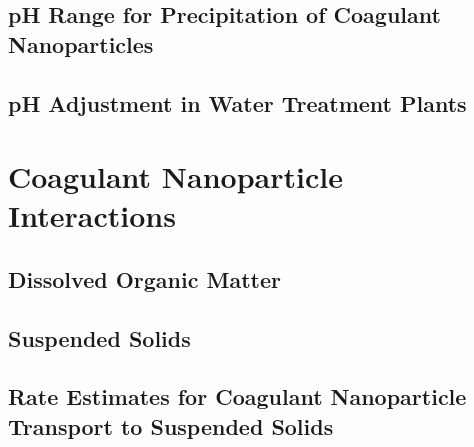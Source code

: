 \documentclass[letterpaper,10pt,english]{sphinxmanual}
\begin{document}
\subsection{pH Range for Precipitation of Coagulant Nanoparticles}
\label{\detokenize{Rapid_Mix/RM_Intro:ph-range-for-precipitation-of-coagulant-nanoparticles}}\label{\detokenize{Rapid_Mix/RM_Intro:heading-ph-range-for-precipitation-of-coagulant-nanoparticles}}

\subsection{pH Adjustment in Water Treatment Plants}
\label{\detokenize{Rapid_Mix/RM_Intro:ph-adjustment-in-water-treatment-plants}}\label{\detokenize{Rapid_Mix/RM_Intro:heading-ph-adjustment-in-water-treatment-plants}}

\section{Coagulant Nanoparticle Interactions}
\label{\detokenize{Rapid_Mix/RM_Intro:coagulant-nanoparticle-interactions}}\label{\detokenize{Rapid_Mix/RM_Intro:heading-coagulant-nanoparticle-interactions}}

\subsection{Dissolved Organic Matter}
\label{\detokenize{Rapid_Mix/RM_Intro:dissolved-organic-matter}}\label{\detokenize{Rapid_Mix/RM_Intro:heading-dissolved-organic-matter}}

\subsection{Suspended Solids}
\label{\detokenize{Rapid_Mix/RM_Intro:suspended-solids}}\label{\detokenize{Rapid_Mix/RM_Intro:heading-suspended-solids}}

\subsection{Rate Estimates for Coagulant Nanoparticle Transport to Suspended Solids}
\label{\detokenize{Rapid_Mix/RM_Intro:rate-estimates-for-coagulant-nanoparticle-transport-to-suspended-solids}}\label{\detokenize{Rapid_Mix/RM_Intro:heading-rate-estimates-for-coagulant-nanoparticle-transport-to-suspended-solids}}
\end{document}
